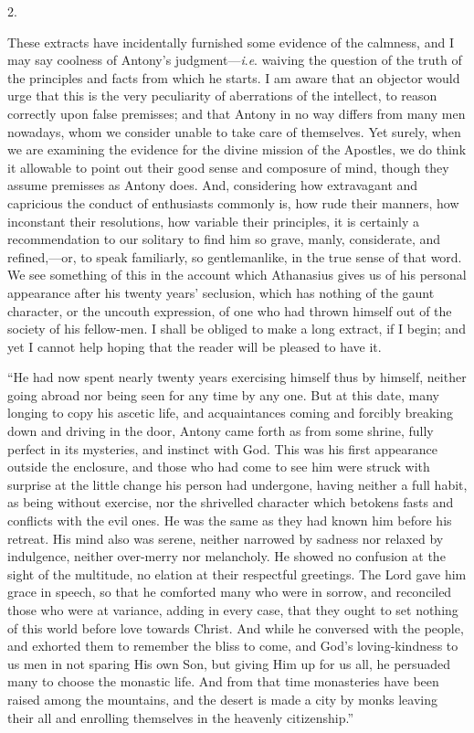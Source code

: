 2.

These extracts have incidentally furnished some evidence of
the calmness, and I may say coolness of Antony's judgment—\emph{i}.\emph{e}.
waiving the question of the truth of the principles and facts from
which he starts. I am aware that an objector would urge that this is
the very peculiarity of aberrations of the intellect, to reason
correctly upon false premisses; and that Antony in no way differs from
many men nowadays, whom we consider unable to take care of themselves.
Yet surely, when we are examining the evidence for the divine mission
of the Apostles, we do think it allowable to point out their good
sense and composure of mind, though they assume premisses as Antony
does. And, considering how extravagant and capricious the conduct of
enthusiasts commonly is, how rude their manners, how inconstant their
resolutions, how variable their principles, it is certainly a
recommendation to our solitary to find him so grave, manly,
considerate, and refined,—or, to speak familiarly, so gentlemanlike,
in the true sense of that word. We see something of this in the
account which Athanasius gives us of his personal appearance after his
twenty years' seclusion, which has nothing of the gaunt character, or
the uncouth expression, of one who had thrown himself out of the
society of his fellow-men. I shall be obliged to make a long extract,
if I begin; and yet I cannot help hoping that the reader will be
pleased to have it.

``He had now spent nearly twenty years exercising himself thus
by himself, neither going abroad nor being seen for any time by any
one. But at this date, many longing to copy his ascetic life, and
acquaintances coming and forcibly breaking down and driving in the
door, Antony came forth as from some shrine, fully perfect in its
mysteries, and instinct with God. This was his first appearance
outside the enclosure, and those who had come to see him were struck
with surprise at the little change his person had undergone, having
neither a full habit, as being without exercise, nor the shrivelled
character which betokens fasts and conflicts with the evil ones. He
was the same as they had known him before his retreat. His mind also
was serene, neither narrowed by sadness nor relaxed by indulgence,
neither over-merry nor melancholy. He showed no confusion at the sight
of the multitude, no elation at their respectful greetings. The Lord
gave him grace in speech, so that he comforted many who were in
sorrow, and reconciled those who were at variance, adding in every
case, that they ought to set nothing of this world before love towards
Christ. And while he conversed with the people, and exhorted them to
remember the bliss to come, and God's loving-kindness to us men in not
sparing His own Son, but giving Him up for us all, he persuaded many
to choose the monastic life. And from that time monasteries have been
raised among the mountains, and the desert is made a city by monks
leaving their all and enrolling themselves in the heavenly
citizenship.''

